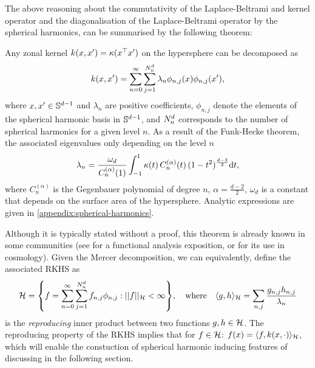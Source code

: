 The above reasoning about the commutativity of the Laplace-Beltrami and kernel operator and the diagonalisation of the Laplace-Beltrami operator by the spherical harmonics, can be summarised by the following theorem:
\begin{theorem}
    \label{theorem:mercer-zonal}
Any zonal kernel $k(x, x') = \kappa(x^{\top} x')$ on the hypersphere can be decomposed as
\begin{equation}
\label{eq:kernel-form}
    k(x, x') = \sum_{n=0}^{\infty} \sum_{j=1}^{N^d_n} \lambda_{n} \phi_{n,j}(x) \phi_{n,j}(x'),
\end{equation}
where $x,x' \in \mathbb{S}^{d-1}$ and $\lambda_{n}$ are positive coefficients, $\phi_{n,j}$ denote the elements of the spherical harmonic basis in $\mathbb{S}^{d-1}$, and $N^d_n$ corresponds to the number of spherical harmonics for a given level $n$. As a result of the Funk-Hecke theorem, the associated eigenvalues only depending on the level $n$
\begin{equation}
    \label{eq:compute-eigenvalues}
        \lambda_{n} = \frac{\omega_{d}}{C_n^{(\alpha)}(1)} \int_{-1}^1 \kappa(t)\,C_n^{(\alpha)}(t)\,(1 - t^2)^{\frac{d-3}{2}} \mathrm{d}{t},
\end{equation} 
where $C_n^{(\alpha)}$ is the Gegenbauer polynomial of degree $n$, $\alpha = \frac{d-2}{2}$, $\omega_d$ is a constant that depends on the surface area of the hypersphere. Analytic expressions are given in \cref{appendix:spherical-harmonics}.
\end{theorem}
Although it is typically stated without a proof, this theorem is already known in some communities (see \citet{wendland2005} for a functional analysis exposition, or \citet{peacock1999cosmological} for its use in cosmology). Given the Mercer decomposition, we can equivalently, define the associated RKHS as
\begin{equation}
    \label{eq:rkhs-sphere}
    \rkhs = \left\{
    f = 
    \sum_{n=0}^\infty \sum_{j=1}^{\dnumharmonicsforlevel} {f}_{n,j} \sh_{n, j}:
    \norm{f}_{\rkhs} < \infty
    \right\},
    \quad\text{where}\quad
    \langle g, h \rangle_{\rkhs} = 
    \sum_{n,j}
            \frac{{g}_{n, j} {h}_{n, j}}{\lambda_{n}}
\end{equation}
is the \emph{reproducing} inner product between two functions $g,h \in {\mathcal{H}}$. The reproducing property of the RKHS implies that for $f \in {\mathcal{H}}$: $f(x) = \langle f, k(x, \cdot) \rangle_{{\mathcal{H}}}$, which will enable the constuction of spherical harmonic inducing features of discussing in the following section.

